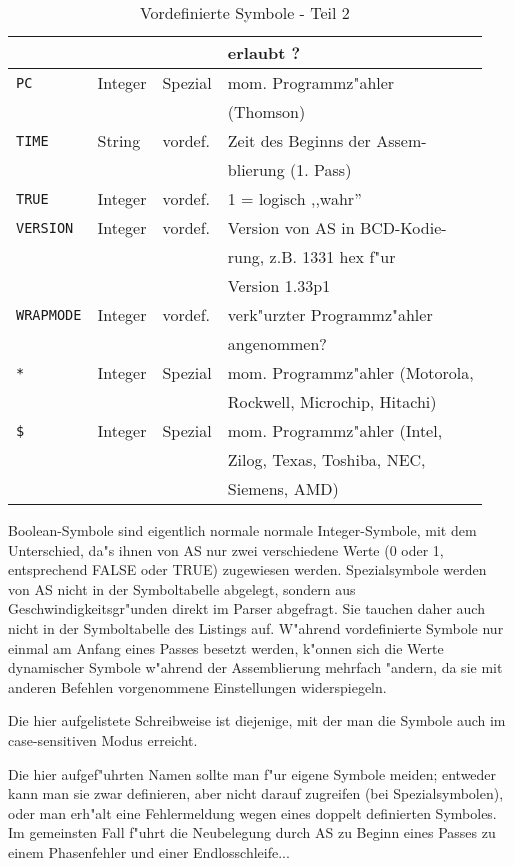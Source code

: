 \documentclass[12pt,a4paper,twoside]{report}
\newcommand{\tty}[1]{{\tt #1}}
\begin{document}
{\begin{table*}
\begin{center}
\begin{tabular}{|l|l|l|l|}
                 &             &            & erlaubt ? \\
\hline
\tty{PC}         &  Integer    & Spezial    & mom. Programmz"ahler \\
                 &             &            & (Thomson) \\
\hline
\tty{TIME}       &  String     & vordef.    & Zeit des Beginns der Assem- \\
                 &             &            & blierung (1. Pass) \\
\hline
\tty{TRUE}       &  Integer    & vordef.    & 1 = logisch ,,wahr'' \\
\hline
\tty{VERSION}    &  Integer    & vordef.    & Version von AS in BCD-Kodie- \\
                 &             &            & rung, z.B. 1331 hex f"ur \\
                 &             &            & Version 1.33p1 \\
\hline
\tty{WRAPMODE}   &  Integer    & vordef.    & verk"urzter Programmz"ahler \\
                 &             &            & angenommen? \\
\hline
\verb!*!         &  Integer    & Spezial    & mom. Programmz"ahler (Motorola, \\
                 &             &            & Rockwell, Microchip, Hitachi) \\
\hline
\tty{\$}         &  Integer    & Spezial    & mom. Programmz"ahler (Intel, \\
                 &             &            & Zilog, Texas, Toshiba, NEC, \\
                 &             &            & Siemens, AMD) \\
\hline
\end{tabular}\end{center}
\caption{Vordefinierte Symbole - Teil 2\label{TabInternSyms2}}
\end{table*}
\par
Boolean-Symbole sind eigentlich normale normale Integer-Symbole, mit
dem Unterschied, da"s ihnen von AS nur zwei verschiedene Werte (0 oder
1, entsprechend FALSE oder TRUE) zugewiesen werden.  Spezialsymbole
werden von AS nicht in der Symboltabelle abgelegt, sondern aus
Geschwindigkeitsgr"unden direkt im Parser abgefragt.  Sie tauchen daher
auch nicht in der Symboltabelle des Listings auf.  W"ahrend vordefinierte
Symbole nur einmal am Anfang eines Passes besetzt werden, k"onnen sich
die Werte dynamischer Symbole w"ahrend der Assemblierung mehrfach "andern,
da sie mit anderen Befehlen vorgenommene Einstellungen widerspiegeln.
\par
Die hier aufgelistete Schreibweise ist diejenige, mit der man die 
Symbole auch im case-sensitiven Modus erreicht.
\par
Die hier aufgef"uhrten Namen sollte man f"ur eigene Symbole meiden;
entweder kann man sie zwar definieren, aber nicht darauf zugreifen
(bei Spezialsymbolen), oder man erh"alt eine Fehlermeldung wegen eines
doppelt definierten Symboles.  Im gemeinsten Fall f"uhrt die Neubelegung
durch AS zu Beginn eines Passes zu einem Phasenfehler und einer
Endlosschleife...


}
\end{document}

